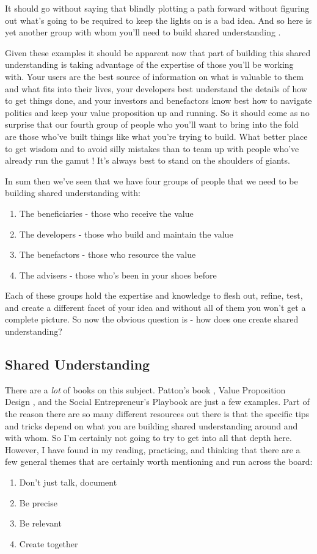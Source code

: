 \documentclass[11pt]{book}
\begin{document}
It should go without saying that blindly plotting a path forward without figuring out what's going to be required to keep the lights on is a bad idea. And so here is yet another group with whom you'll need to build shared understanding \cite{macmillan}. 
\newline

Given these examples it should be apparent now that part of building this shared understanding is taking advantage of the expertise of those you'll be working with. Your users are the best source of information on what is valuable to them and what fits into their lives, your developers best understand the details of how to get things done, and your investors and benefactors know best how to navigate politics and keep your value proposition up and running. So it should come as no surprise that our fourth group of people who you'll want to bring into the fold are those who've built things like what you're trying to build. What better place to get wisdom and to avoid silly mistakes than to team up with people who've already run the gamut \cite{macmillan}! It's always best to stand on the shoulders of giants. 
\newline

In sum then we've seen that we have four groups of people that we need to be building shared understanding with:
\begin{enumerate}
\item The beneficiaries - those who receive the value
\item The developers - those who build and maintain the value
\item The benefactors - those who resource the value
\item The advisers - those who's been in your shoes before
\end{enumerate}  
Each of these groups hold the expertise and knowledge to flesh out, refine, test, and create a different facet of your idea and without all of them you won't get a complete picture. So now the obvious question is - how does one create shared understanding?

\subsection{Shared Understanding}
There are a \textit{lot} of books on this subject. Patton's book \cite{patton}, Value Proposition Design \cite{valueprop}, and the Social Entrepreneur's Playbook \cite{macmillan} are just a few examples. Part of the reason there are so many different resources out there is that the specific tips and tricks depend on what you are building shared understanding around and with whom. So I'm certainly not going to try to get into all that depth here. However, I have found in my reading, practicing, and thinking that there are a few general themes that are certainly worth mentioning and run across the board:
\begin{enumerate}
\item Don't just talk, document
\item Be precise
\item Be relevant
\item Create together
\end{enumerate}
\end{document}
